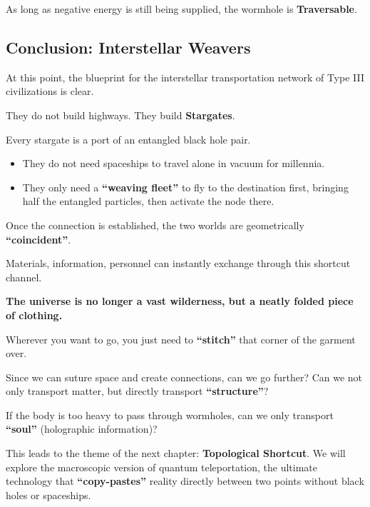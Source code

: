 As long as negative energy is still being supplied, the wormhole is \textbf{Traversable}.

\subsection{Conclusion: Interstellar Weavers}

At this point, the blueprint for the interstellar transportation network of Type III civilizations is clear.

They do not build highways. They build \textbf{Stargates}.

Every stargate is a port of an entangled black hole pair.

\begin{itemize}
\item They do not need spaceships to travel alone in vacuum for millennia.

\item They only need a \textbf{``weaving fleet''} to fly to the destination first, bringing half the entangled particles, then activate the node there.
\end{itemize}

Once the connection is established, the two worlds are geometrically \textbf{``coincident''}.

Materials, information, personnel can instantly exchange through this shortcut channel.

\textbf{The universe is no longer a vast wilderness, but a neatly folded piece of clothing.}

Wherever you want to go, you just need to \textbf{``stitch''} that corner of the garment over.

Since we can suture space and create connections, can we go further? Can we not only transport matter, but directly transport \textbf{``structure''}?

If the body is too heavy to pass through wormholes, can we only transport \textbf{``soul''} (holographic information)?

This leads to the theme of the next chapter: \textbf{Topological Shortcut}. We will explore the macroscopic version of quantum teleportation, the ultimate technology that \textbf{``copy-pastes''} reality directly between two points without black holes or spaceships.

